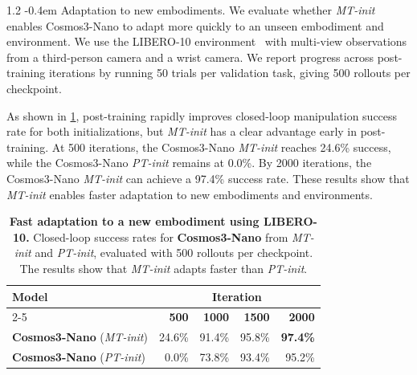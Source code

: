 \documentclass{llmxive}
\makeatletter
\providecommand{\paragraph}{  \@startsection{paragraph}{4}{\z@}    {1\baselineskip \@plus .2\baselineskip}    {-0.4em}    {\normalfont\normalsize\bfseries}}
\makeatother
\begin{document}
\paragraph{Adaptation to new embodiments.}
We evaluate whether \textit{MT-init} enables Cosmos3-Nano to adapt more quickly to an unseen embodiment and environment.
We use the LIBERO-10 environment~\citep{liu2023libero} with multi-view observations from a third-person camera and a wrist camera.
We report progress across post-training iterations by running 50 trials per validation task, giving 500 rollouts per checkpoint.

As shown in \cref{tab:libero_posttraining_success_rate}, post-training rapidly improves closed-loop manipulation success rate for both initializations, but \textit{MT-init} has a clear advantage early in post-training.
At 500 iterations, the Cosmos3-Nano \textit{MT-init} reaches 24.6\% success, while the Cosmos3-Nano \textit{PT-init} remains at 0.0\%.
By 2000 iterations, the Cosmos3-Nano \textit{MT-init} can achieve a 97.4\% success rate.
These results show that \textit{MT-init} enables faster adaptation to new embodiments and environments.

\begin{table}[!htbp]
    \centering
    \small
    \begin{tabular}{@{}lrrrr@{}}
        \toprule
        \multirow{2}{*}{\textbf{Model}} & \multicolumn{4}{c}{\textbf{Iteration}} \\
        \cmidrule(lr){2-5}
            & \textbf{500} & \textbf{1000} & \textbf{1500} & \textbf{2000} \\
        \midrule
        \textbf{Cosmos3-Nano} (\textit{MT-init}) & 24.6\% & 91.4\% & 95.8\% & \textbf{97.4\%} \\
        \textbf{Cosmos3-Nano} (\textit{PT-init}) & 0.0\% & 73.8\% & 93.4\% & 95.2\% \\
        \bottomrule
    \end{tabular}
\caption{
        \textbf{Fast adaptation to a new embodiment using LIBERO-10.} Closed-loop success rates for \textbf{Cosmos3-Nano} from \textit{MT-init} and \textit{PT-init}, evaluated with 500 rollouts per checkpoint. The results show that \textit{MT-init} adapts faster than \textit{PT-init}.
    }
\label{tab:libero_posttraining_success_rate}
\end{table}
\end{document}

